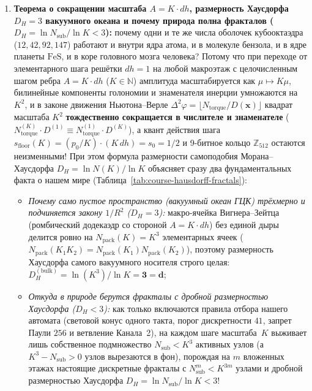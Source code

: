 \begin{enumerate}[label=\textbf{(\alph*)},noitemsep]
\item \textbf{Теорема о сокращении масштаба $A = K\cdot dh$, размерность Хаусдорфа $D_H = 3$ вакуумного океана и почему природа полна фракталов ($D_H = \ln N_{\mathrm{sub}}/\ln K < 3$):}
  почему одни и те же числа оболочек кубооктаэдра ($12, 42, 92, 147$) работают и внутри ядра атома, и в молекуле бензола, и в ядре планеты $\mathrm{FeS}$, и в коре головного мозга человека? Потому что при переходе от элементарного шага решётки $dh = 1$ на любой макроэтаж с целочисленным шагом ребра $A = K\cdot dh$ ($K\in\mathbb{N}$) амплитуда масштабируется как $\mu \mapsto K\mu$, билинейные компоненты голономии и знаменателя инерции умножаются на $K^2$, и в законе движения Ньютона--Верле $\Delta^2\varphi = \lfloor N_{\mathrm{torque}}/D(\mathbf{x})\rfloor$ квадрат масштаба $K^2$ \textbf{тождественно сокращается в числителе и знаменателе} ($N_{\mathrm{torque}}^{(K)}\cdot D^{(1)} \equiv N_{\mathrm{torque}}^{(1)}\cdot D^{(K)}$), а квант действия шага $s_{\mathrm{floor}}(K) = (p_0/K)\cdot(K\,dh) = s_0 = 1/2$ и 9-битное кольцо $\mathbb{Z}_{512}$ остаются неизменными!
  При этом формула размерности самоподобия Морана--Хаусдорфа $D_H = \ln N(K)/\ln K$ объясняет сразу два фундаментальных факта о нашем мире (Таблица~\ref{tab:course-hausdorff-fractals}):
  \begin{itemize}[noitemsep]
  \item \emph{Почему само пустое пространство (вакуумный океан ГЦК) трёхмерно и подчиняется закону $1/R^2$ ($D_H = 3$):}
    макро-ячейка Вигнера--Зейтца (ромбический додекаэдр со стороной $A = K\cdot dh$) без единой дыры делится ровно на $N_{\mathrm{pack}}(K) = K^3$ элементарных ячеек ($N_{\mathrm{pack}}(K_1 K_2) = N_{\mathrm{pack}}(K_1)N_{\mathrm{pack}}(K_2)$), поэтому размерность Хаусдорфа самого вакуумного носителя строго целая: $D_H^{(\mathrm{bulk})} = \ln(K^3)/\ln K = \mathbf{3 = d}$;
  \item \emph{Откуда в природе берутся фракталы с дробной размерностью Хаусдорфа ($D_H < 3$):}
    как только включаются правила отбора нашего автомата (световой конус одного такта, порог дискретности $41$, запрет Паули $256$ и ветвление Канала~2), на каждом шаге масштаба~$K$ выживает лишь собственное подмножество $N_{\mathrm{sub}} < K^3$ активных узлов (а $K^3 - N_{\mathrm{sub}} > 0$ узлов вырезаются в фон), порождая на $m$ вложенных этажах настоящие дискретные фракталы с $N_{\mathrm{sub}}^m < K^{3m}$ узлами и дробной размерностью Хаусдорфа $D_H = \ln N_{\mathrm{sub}}/\ln K < 3$!
  \end{itemize}
\end{enumerate}

